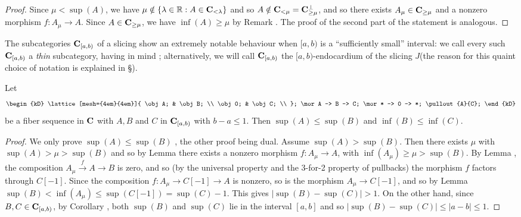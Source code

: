 \begin{proof}
Since $\mu<\sup(A)$, we have $\mu\notin\{\lambda\in \mathbb{R}: A\in \mathbf{C}_{<\lambda}\}$ and so $A\notin \mathbf{C}_{<\mu} = \mathbf{C}_{\geq \mu}^\perp$, and so there exists $A_\mu\in \mathbf{C}_{\geq \mu}$ and a nonzero morphism $f\colon A_\mu\to A$. Since $A\in \mathbf{C}_{\geq \mu}$, we have $\inf(A)\geq \mu$ by Remark . The proof of the second part of the statement is analogous. 
\end{proof}
\begin{definition}\label{thin.subcat}
The subcategories $\mathbf{C}_{[a,b)}$ of a slicing show an extremely notable behaviour when $[a,b)$ is a ``sufficiently small'' interval: we call every such $\mathbf{C}_{[a,b)}$ a \emph{thin} subcategory, having in mind \cite[\adef \textbf{7.2}]{Brid}; alternatively, we will call $\mathbf{C}_{[a,b)}$ the $[a,b)$\hyp{}endocardium of the slicing $J$(the reason for this quaint choice of notation is explained in \S{}).
\end{definition}
\begin{lemma}\label{lem:thin.are.closed}
Let  
 \[
\begin{kD}
\lattice[mesh={4em}{4em}]{
  \obj A; & \obj B; \\
  \obj 0; & \obj C; \\
};
\mor A -> B -> C;
\mor * -> 0 -> *;
\pullout{A}{C};
\end{kD}
 \]
be a fiber sequence in $\mathbf{C}$ with $A,B$ and $C$ in $\mathbf{C}_{[a,b)}$ with $b-a\leq 1$. Then $\sup(A)\leq \sup(B)$ and $\inf(B)\leq \inf(C)$.
\end{lemma}
\begin{proof}
We only prove $\sup(A)\leq \sup(B)$ , the other proof being dual. Assume $\sup(A)>\sup(B)$. Then there exists $\mu$ with $\sup(A)>\mu>\sup(B)$ and so by Lemma  there exists a nonzero morphism $f\colon A_\mu\to A$, with $\inf(A_\mu)\geq \mu>\sup(B)$. By Lemma , the composition $A_\mu\xrightarrow{f} A\to B$ is zero, and so (by the universal property and the 3\hyp{}for\hyp{}2 property of pullbacks) the morphism $f$ factors through $C[-1]$. Since the composition $f\colon A_\mu\to C[-1]\to A$ is nonzero, so is the morphism $A_\mu\to C[-1]$, and so by Lemma  $\sup(B)<\inf(A_\mu)\leq \sup(C[-1])=\sup(C)-1$. This gives $|\sup(B)-\sup(C)|>1$. On the other hand, since $B,C\in \mathbf{C}_{[a,b)}$, by Corollary , both $\sup(B)$ and $\sup(C)$ lie in the interval $[a,b]$ and so $|\sup(B)-\sup(C)|\leq |a-b|\leq 1$.
\end{proof}
